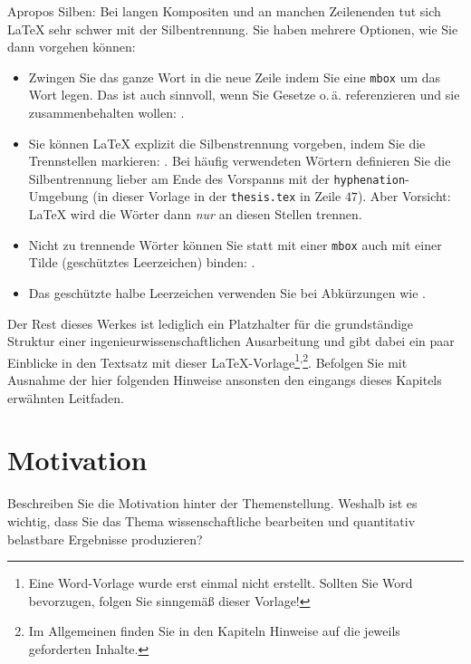 Apropos Silben: Bei langen Kompositen und an manchen Zeilenenden tut sich \LaTeX{} sehr schwer mit der Silbentrennung. Sie haben mehrere Optionen, wie Sie dann vorgehen können:
\begin{itemize}
    \item{Zwingen Sie das ganze Wort in die neue Zeile indem Sie eine \texttt{mbox} um das Wort legen. Das ist auch sinnvoll, wenn Sie Gesetze o.\,ä. referenzieren und sie zusammenbehalten wollen: .}
    \item{Sie können \LaTeX{} explizit die Silbenstrennung vorgeben, indem Sie die Trennstellen markieren: . Bei häufig verwendeten Wörtern definieren Sie die Silbentrennung lieber am Ende des Vorspanns mit der \texttt{hyphenation}-Umgebung (in dieser Vorlage in der \texttt{thesis.tex} in Zeile $47$). Aber Vorsicht: \LaTeX{} wird die Wörter dann \emph{nur} an diesen Stellen trennen.}
    \item{Nicht zu trennende Wörter können Sie statt mit einer \texttt{mbox} auch mit einer Tilde (geschütztes Leerzeichen) binden: .}
    \item{Das geschützte halbe Leerzeichen verwenden Sie bei Abkürzungen wie .}
\end{itemize}

Der Rest dieses Werkes ist lediglich ein Platzhalter für die grundständige Struktur einer ingenieurwissenschaftlichen Ausarbeitung und gibt dabei ein paar Einblicke in den Textsatz mit dieser \LaTeX{}-Vorlage\footnote{Eine Word-Vorlage wurde erst einmal nicht erstellt. Sollten Sie Word bevorzugen, folgen Sie sinngemäß dieser Vorlage!}\textsuperscript{,}\footnote{Im Allgemeinen finden Sie in den Kapiteln Hinweise auf die jeweils geforderten Inhalte.}. Befolgen Sie mit Ausnahme der hier folgenden Hinweise ansonsten den eingangs dieses Kapitels erwähnten  Leitfaden.


\section{Motivation}\label{sec:Intro:Motivation}
Beschreiben Sie die Motivation hinter der Themenstellung. Weshalb ist es wichtig, dass Sie das Thema wissenschaftliche bearbeiten und quantitativ belastbare Ergebnisse produzieren?



